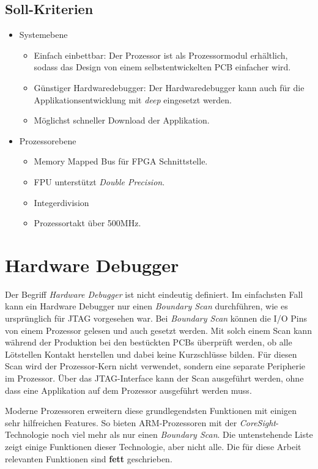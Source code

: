 \subsection{Soll-Kriterien}
\begin{itemize}
\item Systemebene
	\begin{itemize}
	\item Einfach einbettbar: Der Prozessor ist als Prozessormodul erhältlich, sodass das Design von einem selbstentwickelten PCB einfacher wird.
	\item Günstiger Hardwaredebugger: Der Hardwaredebugger kann auch für die Applikationsentwicklung mit \textit{deep} eingesetzt werden.
	\item Möglichst schneller Download der Applikation.
	\end{itemize}
\item Prozessorebene
	\begin{itemize}
	\item Memory Mapped Bus für FPGA Schnittstelle.
	\item FPU unterstützt \textit{Double Precision}.
	\item Integerdivision
	\item Prozessortakt über 500MHz.
	\end{itemize}
\end{itemize}


\section{Hardware Debugger}
Der Begriff \textit{Hardware Debugger} ist nicht eindeutig definiert.
Im einfachsten Fall kann ein Hardware Debugger nur einen \textit{Boundary Scan} durchführen, wie es ursprünglich für JTAG vorgesehen war.
Bei \textit{Boundary Scan} können die I/O Pins von einem Prozessor gelesen und auch gesetzt werden.
Mit solch einem Scan kann während der Produktion bei den bestückten PCBs überprüft werden, ob alle Lötstellen Kontakt herstellen und dabei keine Kurzschlüsse bilden.
Für diesen Scan wird der Prozessor-Kern nicht verwendet, sondern eine separate Peripherie im Prozessor.
Über das JTAG-Interface kann der Scan ausgeführt werden, ohne dass eine Applikation auf dem Prozessor ausgeführt werden muss.

Moderne Prozessoren erweitern diese grundlegendsten Funktionen mit einigen sehr hilfreichen Features.
So bieten ARM-Prozessoren mit der \textit{CoreSight}-Technologie noch viel mehr als nur einen \textit{Boundary Scan}.
Die untenstehende Liste zeigt einige Funktionen dieser Technologie, aber nicht alle.
Die für diese Arbeit relevanten Funktionen sind \textbf{fett} geschrieben.

